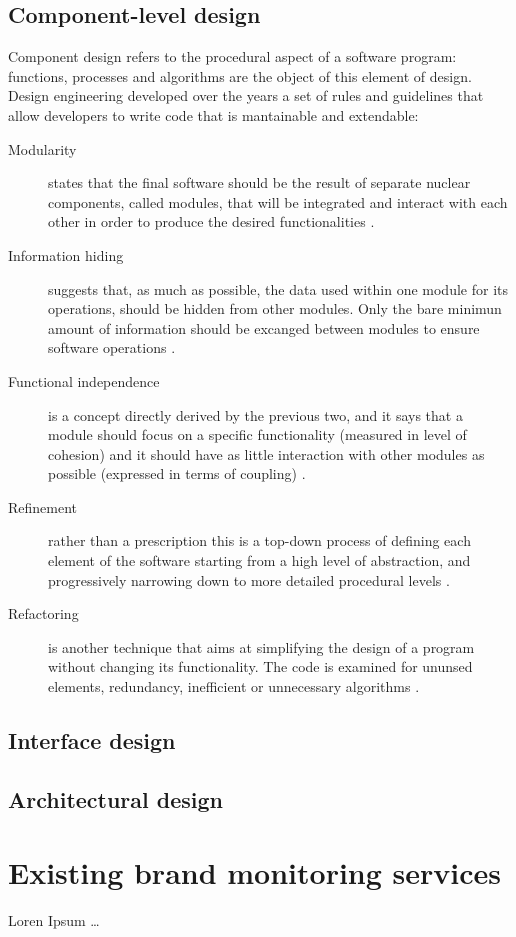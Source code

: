 \subsection{Component-level design}
Component design refers to the procedural aspect of a software program:
functions, processes and algorithms are the object of this element of design.
Design engineering developed over the years a set of rules and guidelines that
allow developers to write code that is mantainable and extendable:
\begin{description}
\item [Modularity] states that the final software should be the result of
separate nuclear components, called modules, that will be integrated and
interact with each other in order to produce the desired functionalities
\cite{GM78}.
\item [Information hiding] suggests that, as much as possible, the data used
within one module for its operations, should be hidden from other modules. Only
the bare minimun amount of information should be excanged between modules to
ensure software operations \cite{DP72}.
\item [Functional independence] is a concept directly derived by the previous
two, and it says that a module should focus on a specific functionality
(measured in level of cohesion) and it should have as little interaction with
other modules as possible (expressed in terms of coupling) \cite{DP72}.
\item [Refinement] rather than a prescription this is a top-down process of
defining each element of the software starting from a high level of abstraction,
and progressively narrowing down to more detailed procedural levels \cite{NW71}.
\item [Refactoring] is another technique that aims at simplifying the design
of a program without changing its functionality. The code is examined for
ununsed elements, redundancy, inefficient or unnecessary algorithms \cite{RP05}.
\end{description}

\subsection{Interface design}


\subsection{Architectural design}


\section{Existing brand monitoring services}
Loren Ipsum \ldots